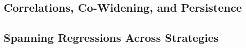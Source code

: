 

\subsection{Correlations, Co-Widening, and Persistence}
\label{sec:rq3_corr}

%
%
%
%
%


\subsection{Spanning Regressions Across Strategies}
\label{sec:rq3_crossreg}

%
%
%


